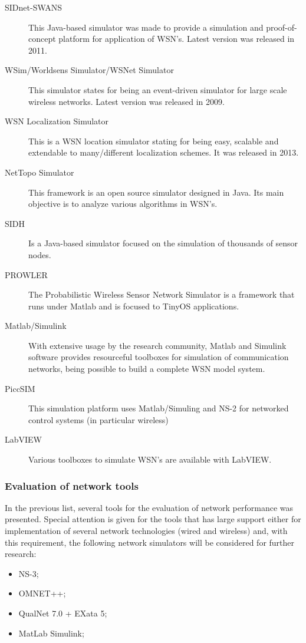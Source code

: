 \begin{description}
	\item [SIDnet-SWANS]
	This Java-based simulator was made to provide a simulation and proof-of-concept platform for application of WSN's.
	Latest version was released in 2011.
	
	\item [WSim/Worldsens Simulator/WSNet Simulator]
	This simulator states for being an event-driven simulator for large scale wireless networks. Latest version was released in 2009.

	\item [WSN Localization Simulator]
	This is a WSN location simulator stating for being easy, scalable and extendable to many/different localization schemes. It was released in 2013.
	
	\item [NetTopo Simulator]
	This framework is an open source simulator designed in Java. Its main objective is to analyze various algorithms in WSN's. 
	
	\item [SIDH]
	Is a Java-based simulator focused on the simulation of thousands of sensor nodes.
	
	\item [PROWLER]
	The Probabilistic Wireless Sensor Network Simulator is a framework that runs under Matlab and is focused to TinyOS applications.
	
	\item [Matlab/Simulink]
	With extensive usage by the research community, Matlab and Simulink software provides resourceful toolboxes for simulation of communication networks, being possible to build a complete WSN model system.
	
	\item [PiccSIM]
	This simulation platform uses Matlab/Simuling and NS-2 for networked control systems (in particular wireless)
	
	\item [LabVIEW]
	Various toolboxes to simulate WSN's are available with LabVIEW.
	
\end{description}


\subsubsection{Evaluation of network tools}

In the previous list, several tools for the evaluation of network performance was presented. Special attention is given for the tools that has large support either for implementation of several network technologies (wired and wireless) and, with this requirement, the following network simulators will be considered for further research:
	
\begin{itemize}
	\setlength\itemsep{-0.5em}
	\item NS-3;
	\item OMNET++;
	\item QualNet 7.0 + EXata 5;
	\item MatLab Simulink;
\end{itemize}



